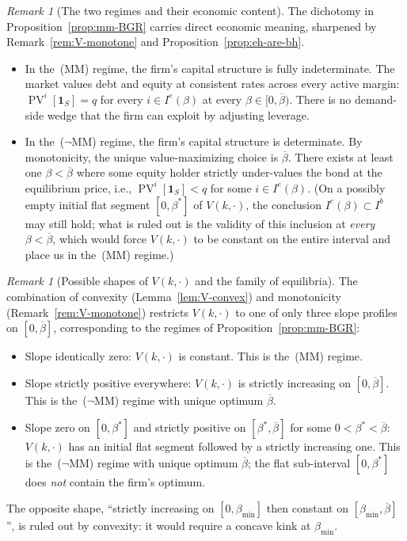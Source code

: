 \documentclass[11pt,a4paper,oneside]{book}
\def\1{\mathbf{1}}
\DeclareMathOperator{\PV}{PV}
\theoremstyle{plain}
\theoremstyle{definition}
\theoremstyle{remark}
\newtheorem{remark}[theorem]{Remark}
\numberwithin{equation}{chapter}
\begin{document}
\begin{remark}[The two regimes and their economic content]\label{rem:two-regimes}
The dichotomy in Proposition~\ref{prop:mm-BGR} carries direct economic meaning, sharpened by Remark~\ref{rem:V-monotone} and Proposition~\ref{prop:eh-are-bh}.
\begin{itemize}
  \item In the~\textup{(MM)} regime, the firm's capital structure is fully indeterminate. The market values debt and equity at consistent rates across every active margin: $\PV^i[\1_S] = q$ for every $i \in I^e(\beta)$ at every $\beta \in [0, \overline{\beta})$. There is no demand-side wedge that the firm can exploit by adjusting leverage.
  \item In the~\textup{($\neg$MM)} regime, the firm's capital structure is determinate. By monotonicity, the unique value-maximizing choice is $\overline{\beta}$. There exists at least one $\beta < \overline{\beta}$ where some equity holder strictly under-values the bond at the equilibrium price, i.e., $\PV^i[\1_S] < q$ for some $i \in I^e(\beta)$. \textup{(}On a possibly empty initial flat segment $[0, \beta^\ast]$ of $V(k, \cdot)$, the conclusion $I^e(\beta) \subset I^b$ may still hold; what is ruled out is the validity of this inclusion at \emph{every} $\beta < \overline{\beta}$, which would force $V(k, \cdot)$ to be constant on the entire interval and place us in the~\textup{(MM)} regime.\textup{)}
\end{itemize}
\end{remark}

\begin{remark}[Possible shapes of $V(k, \cdot)$ and the family of equilibria]\label{rem:V-shapes-and-BGR}
The combination of convexity (Lemma~\ref{lem:V-convex}) and monotonicity (Remark~\ref{rem:V-monotone}) restricts $V(k, \cdot)$ to one of only three slope profiles on $[0, \overline{\beta}]$, corresponding to the regimes of Proposition~\ref{prop:mm-BGR}:
\begin{itemize}
  \item Slope identically zero: $V(k, \cdot)$ is constant. This is the~\textup{(MM)} regime.
  \item Slope strictly positive everywhere: $V(k, \cdot)$ is strictly increasing on $[0, \overline{\beta}]$. This is the~\textup{($\neg$MM)} regime with unique optimum $\overline{\beta}$.
  \item Slope zero on $[0, \beta^\ast]$ and strictly positive on $[\beta^\ast, \overline{\beta}]$ for some $0 < \beta^\ast < \overline{\beta}$: $V(k, \cdot)$ has an initial flat segment followed by a strictly increasing one. This is the~\textup{($\neg$MM)} regime with unique optimum $\overline{\beta}$; the flat sub-interval $[0, \beta^\ast]$ does \emph{not} contain the firm's optimum.
\end{itemize}
The opposite shape, ``strictly increasing on $[0, \beta_{\min}]$ then constant on $[\beta_{\min}, \overline{\beta}]$'', is ruled out by convexity: it would require a concave kink at $\beta_{\min}$.
\end{remark}
\end{document}
